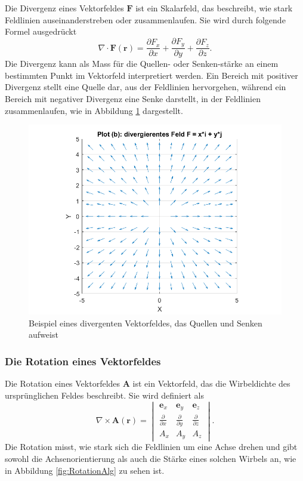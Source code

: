 Die Divergenz eines Vektorfeldes $\boldsymbol{F}$ ist ein Skalarfeld, das beschreibt, wie stark Feldlinien auseinanderstreben oder zusammenlaufen. Sie wird durch folgende Formel ausgedrückt
\begin{equation}
\nabla \cdot \boldsymbol{F}(\boldsymbol{r}) = \frac{\partial F_x}{\partial x} + \frac{\partial F_y}{\partial y} + \frac{\partial F_z}{\partial z}.
\end{equation}
Die Divergenz kann als Mass für die Quellen- oder Senken-stärke an einem bestimmten Punkt im Vektorfeld interpretiert werden. Ein Bereich mit positiver Divergenz stellt eine Quelle dar, aus der Feldlinien hervorgehen, während ein Bereich mit negativer Divergenz eine Senke darstellt, in der Feldlinien zusammenlaufen, wie in Abbildung \ref{fig:DivergenzAlg} dargestellt.

\begin{figure}
    \centering
    \includegraphics[scale=0.4]{papers/helmholtz/images/divergentes_Feld.png}
    \caption{Beispiel eines divergenten Vektorfeldes, das Quellen und Senken aufweist}
    \label{fig:DivergenzAlg}
\end{figure}

\subsubsection{Die Rotation eines Vektorfeldes}

Die Rotation eines Vektorfeldes $\boldsymbol{A}$ ist ein Vektorfeld, das die Wirbeldichte des ursprünglichen Feldes beschreibt. Sie wird definiert als
\begin{equation}
\nabla \times \boldsymbol{A}(\boldsymbol{r}) = \begin{vmatrix}
    \boldsymbol{e}_x & \boldsymbol{e}_y & \boldsymbol{e}_z \\
    \frac{\partial}{\partial x} & \frac{\partial}{\partial y} & \frac{\partial}{\partial z}\\
    A_x & A_y & A_z
\end{vmatrix}.
\end{equation}
Die Rotation misst, wie stark sich die Feldlinien um eine Achse drehen und gibt sowohl die Achsenorientierung als auch die Stärke eines solchen Wirbels an, wie in Abbildung \ref{fig:RotationAlg} zu sehen ist.

